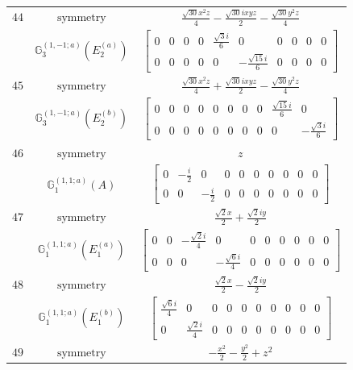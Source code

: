 \documentclass[fleqn,8pt,landscape]{jsarticle}
\begin{document}
\begin{longtable}{ccc}
$ 44 $ & $ \text{symmetry} $ & $ \frac{\sqrt{30} x^{2} z}{4} - \frac{\sqrt{30} i x y z}{2} - \frac{\sqrt{30} y^{2} z}{4} $ \\
$  $ & $ \mathbb{G}_{3}^{(1,-1;a)}(E_{2}^{(a)}) $ & $ \begin{bmatrix} 0 & 0 & 0 & 0 & \frac{\sqrt{3} i}{6} & 0 & 0 & 0 & 0 & 0 \\ 0 & 0 & 0 & 0 & 0 & - \frac{\sqrt{15} i}{6} & 0 & 0 & 0 & 0 \end{bmatrix} $ \\ \hline
$ 45 $ & $ \text{symmetry} $ & $ \frac{\sqrt{30} x^{2} z}{4} + \frac{\sqrt{30} i x y z}{2} - \frac{\sqrt{30} y^{2} z}{4} $ \\
$  $ & $ \mathbb{G}_{3}^{(1,-1;a)}(E_{2}^{(b)}) $ & $ \begin{bmatrix} 0 & 0 & 0 & 0 & 0 & 0 & 0 & 0 & \frac{\sqrt{15} i}{6} & 0 \\ 0 & 0 & 0 & 0 & 0 & 0 & 0 & 0 & 0 & - \frac{\sqrt{3} i}{6} \end{bmatrix} $ \\ \hline
$ 46 $ & $ \text{symmetry} $ & $ z $ \\
$  $ & $ \mathbb{G}_{1}^{(1,1;a)}(A) $ & $ \begin{bmatrix} 0 & - \frac{i}{2} & 0 & 0 & 0 & 0 & 0 & 0 & 0 & 0 \\ 0 & 0 & - \frac{i}{2} & 0 & 0 & 0 & 0 & 0 & 0 & 0 \end{bmatrix} $ \\ \hline
$ 47 $ & $ \text{symmetry} $ & $ \frac{\sqrt{2} x}{2} + \frac{\sqrt{2} i y}{2} $ \\
$  $ & $ \mathbb{G}_{1}^{(1,1;a)}(E_{1}^{(a)}) $ & $ \begin{bmatrix} 0 & 0 & - \frac{\sqrt{2} i}{4} & 0 & 0 & 0 & 0 & 0 & 0 & 0 \\ 0 & 0 & 0 & - \frac{\sqrt{6} i}{4} & 0 & 0 & 0 & 0 & 0 & 0 \end{bmatrix} $ \\ \hline
$ 48 $ & $ \text{symmetry} $ & $ \frac{\sqrt{2} x}{2} - \frac{\sqrt{2} i y}{2} $ \\
$  $ & $ \mathbb{G}_{1}^{(1,1;a)}(E_{1}^{(b)}) $ & $ \begin{bmatrix} \frac{\sqrt{6} i}{4} & 0 & 0 & 0 & 0 & 0 & 0 & 0 & 0 & 0 \\ 0 & \frac{\sqrt{2} i}{4} & 0 & 0 & 0 & 0 & 0 & 0 & 0 & 0 \end{bmatrix} $ \\ \hline
$ 49 $ & $ \text{symmetry} $ & $ - \frac{x^{2}}{2} - \frac{y^{2}}{2} + z^{2} $ \\

\end{longtable}
\end{document}
